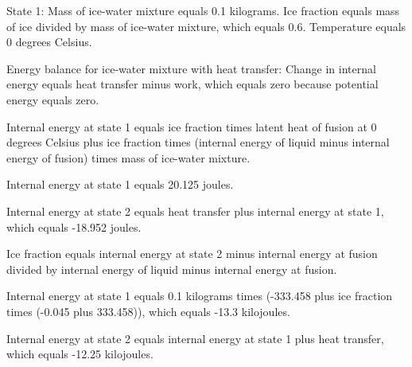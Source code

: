 State 1:  
Mass of ice-water mixture equals 0.1 kilograms.  
Ice fraction equals mass of ice divided by mass of ice-water mixture, which equals 0.6.  
Temperature equals 0 degrees Celsius.  

Energy balance for ice-water mixture with heat transfer:  
Change in internal energy equals heat transfer minus work, which equals zero because potential energy equals zero.  

Internal energy at state 1 equals ice fraction times latent heat of fusion at 0 degrees Celsius plus ice fraction times (internal energy of liquid minus internal energy of fusion) times mass of ice-water mixture.  

Internal energy at state 1 equals 20.125 joules.  

Internal energy at state 2 equals heat transfer plus internal energy at state 1, which equals -18.952 joules.  

Ice fraction equals internal energy at state 2 minus internal energy at fusion divided by internal energy of liquid minus internal energy at fusion.  

Internal energy at state 1 equals 0.1 kilograms times (-333.458 plus ice fraction times (-0.045 plus 333.458)), which equals -13.3 kilojoules.  

Internal energy at state 2 equals internal energy at state 1 plus heat transfer, which equals -12.25 kilojoules.
